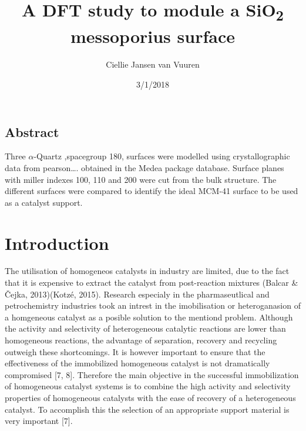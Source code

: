 \documentclass[]{article}
\title{A DFT study to module a SiO\textsubscript{2} messoporius surface}
\author{Ciellie Jansen van Vuuren}
\date{3/1/2018}
\begin{document}
\maketitle

\hypertarget{abstract}{%
\subsection{Abstract}\label{abstract}}

Three \(\alpha\)-Quartz ,spacegroup 180, surfaces were modelled using
crystallographic data from pearson\ldots{}. obtained in the Medea
package database. Surface planes with miller indexes 100, 110 and 200
were cut from the bulk structure. The different surfaces were compared
to identify the ideal MCM-41 surface to be used as a catalyst support.

\hypertarget{introduction}{%
\section{Introduction}\label{introduction}}

The utilisation of homogeneos catalysts in industry are limited, due to
the fact that it is expensive to extract the catalyst from post-reaction
mixtures (Balcar \& Čejka, 2013)(Kotzé, 2015). Research especialy in the
pharmaseutlical and petrochemistry industries took an intrest in the
imobilisation or heteroganasion of a homgeneous catalyst as a posible
solution to the mentiond problem. Although the activity and selectivity
of heterogeneous catalytic reactions are lower than homogeneous
reactions, the advantage of separation, recovery and recycling outweigh
these shortcomings. It is however important to ensure that the
effectiveness of the immobilized homogeneous catalyst is not
dramatically compromised {[}7, 8{]}. Therefore the main objective in the
successful immobilization of homogeneous catalyst systems is to combine
the high activity and selectivity properties of homogeneous catalysts
with the ease of recovery of a heterogeneous catalyst. To accomplish
this the selection of an appropriate support material is very important
{[}7{]}.
\end{document}
